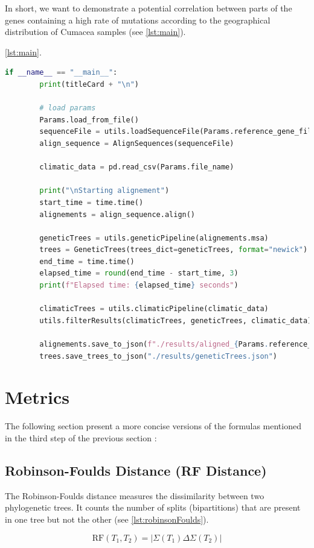 In short, we want to demonstrate a potential correlation between parts of the genes containing a high rate of mutations according to the geographical distribution of Cumacea samples (see \autoref{lst:main}).

\autoref{lst:main}.
\begin{lstlisting}[label=lst:main,language=Python,caption=aPhyloGeo’s main function]
    if __name__ == "__main__":
        print(titleCard + "\n")

        # load params 
        Params.load_from_file()
        sequenceFile = utils.loadSequenceFile(Params.reference_gene_filepath)
        align_sequence = AlignSequences(sequenceFile)

        climatic_data = pd.read_csv(Params.file_name)

        print("\nStarting alignement")
        start_time = time.time()
        alignements = align_sequence.align()

        geneticTrees = utils.geneticPipeline(alignements.msa)
        trees = GeneticTrees(trees_dict=geneticTrees, format="newick")
        end_time = time.time()
        elapsed_time = round(end_time - start_time, 3)
        print(f"Elapsed time: {elapsed_time} seconds")

        climaticTrees = utils.climaticPipeline(climatic_data)
        utils.filterResults(climaticTrees, geneticTrees, climatic_data)

        alignements.save_to_json(f"./results/aligned_{Params.reference_gene_file}.json")
        trees.save_trees_to_json("./results/geneticTrees.json")
\end{lstlisting}

\section{Metrics}\label{metrics}
The following section present a more concise versions of the formulas mentioned in the third step of the previous section :

\subsection{Robinson-Foulds Distance (RF Distance)}\label{RF}
The Robinson-Foulds distance measures the dissimilarity between two phylogenetic trees. It counts the number of splits (bipartitions) that are present in one tree but not the other (see \autoref{lst:robinsonFoulds}).

\[ \text{RF}(T_1, T_2) = | \Sigma(T_1) \Delta \Sigma(T_2) | \]

